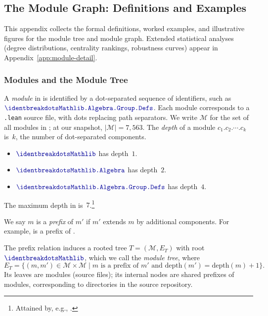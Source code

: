 \subsection{The Module Graph: Definitions and Examples}
\label{sec:module-import}

This appendix collects the formal definitions, worked examples, and illustrative figures for the module tree and module graph. Extended statistical analyses (degree distributions, centrality rankings, robustness curves) appear in Appendix~\ref{app:module-detail}.

\subsubsection{Modules and the Module Tree}

\begin{definition}[Module]\label{def:module}
A \emph{module} in  is identified by a dot-separated sequence of identifiers, such as $\module{Mathlib.Algebra.Group.Defs}$. Each module corresponds to a \texttt{.lean} source file, with dots replacing path separators. We write $\mathcal{M}$ for the set of all modules in ; at our snapshot, $|\mathcal{M}| = 7{,}563$.
The \emph{depth} of a module $c_1.c_2.\cdots.c_k$ is~$k$, the number of dot-separated components.
\end{definition}

\begin{example}
\leavevmode
\begin{itemize}
  \item $\module{Mathlib}$ has depth~$1$.
  \item $\module{Mathlib.Algebra}$ has depth~$2$.
  \item $\module{Mathlib.Algebra.Group.Defs}$ has depth~$4$.
\end{itemize}
The maximum depth in  is~$7$.\footnote{Attained by, e.g., .}
\end{example}

We say $m$ is a \emph{prefix} of $m'$ if $m'$ extends $m$ by additional components. For example,  is a prefix of .

\begin{definition}\label{def:module-tree}
The prefix relation induces a rooted tree $T = (\mathcal{M}, E_T)$ with root $\module{Mathlib}$, which we call the \emph{module tree}, where
\[
  E_T = \{(m, m') \in \mathcal{M} \times \mathcal{M} \mid m \text{ is a prefix of } m' \text{ and } \mathrm{depth}(m') = \mathrm{depth}(m) + 1\}.
\]
Its leaves are modules (source files); its internal nodes are shared prefixes of modules, corresponding to directories in the source repository.
\end{definition}

